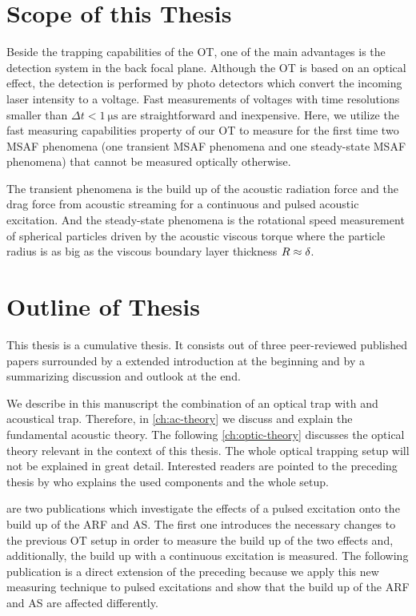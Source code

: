 \section{Scope of this Thesis}

Beside the trapping capabilities of the OT, one of the main advantages is the 
detection system in the back focal plane. Although the OT is based on an 
optical effect, the detection is performed by photo detectors which convert the 
incoming laser intensity to a voltage. Fast measurements of voltages with time 
resolutions smaller than $\Delta t < \SI{1}{\us}$ are straightforward and 
inexpensive. Here, we utilize the fast measuring capabilities property of our 
OT to measure for the first time two MSAF phenomena (one transient MSAF 
phenomena and one steady-state MSAF phenomena) that cannot be measured 
optically otherwise.

The transient phenomena is the build up of the acoustic radiation force and the 
drag force from acoustic streaming for a continuous and pulsed acoustic 
excitation. And the steady-state phenomena is the rotational speed measurement 
of spherical particles driven by the acoustic viscous torque where the particle 
radius is as big as the viscous boundary layer thickness $R\approx\delta$.

\section{Outline of Thesis\label{sec:I-outline}}

This thesis is a cumulative thesis. It consists out of three peer-reviewed 
published papers surrounded by a extended introduction at the beginning and by 
a summarizing discussion and outlook at the end.

We describe in this manuscript the combination of an optical trap with and 
acoustical trap. Therefore, in \cref{ch:ac-theory} we discuss and explain the 
fundamental acoustic theory. The following \cref{ch:optic-theory} discusses the 
optical theory relevant in the context of this thesis. The whole optical 
trapping setup will not be explained in great detail. Interested readers are 
pointed to the preceding thesis by  who explains the used 
components and the whole setup.

 are two publications which investigate the 
effects of a pulsed excitation onto the build up of the ARF and AS. The first 
one introduces the necessary changes to the previous OT setup in order to 
measure the build up of the two effects and, additionally, the build up with a 
continuous excitation is measured. The following publication is a direct 
extension of the preceding because we apply this new measuring technique to 
pulsed excitations and show that the build up of the ARF and AS are affected 
differently.

